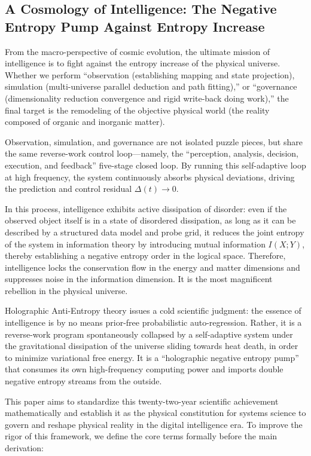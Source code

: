 \documentclass{article}
\begin{document}
\subsection*{A Cosmology of Intelligence: The Negative Entropy Pump Against Entropy Increase}
From the macro-perspective of cosmic evolution, the ultimate mission of intelligence is to fight against the entropy increase of the physical universe. Whether we perform ``observation (establishing mapping and state projection), simulation (multi-universe parallel deduction and path fitting),'' or ``governance (dimensionality reduction convergence and rigid write-back doing work),'' the final target is the remodeling of the objective physical world (the reality composed of organic and inorganic matter).

Observation, simulation, and governance are not isolated puzzle pieces, but share the same reverse-work control loop---namely, the ``perception, analysis, decision, execution, and feedback'' five-stage closed loop. By running this self-adaptive loop at high frequency, the system continuously absorbs physical deviations, driving the prediction and control residual $\Delta(t) \to 0$.

In this process, intelligence exhibits active dissipation of disorder: even if the observed object itself is in a state of disordered dissipation, as long as it can be described by a structured data model and probe grid, it reduces the joint entropy of the system in information theory by introducing mutual information $I(X; Y)$, thereby establishing a negative entropy order in the logical space. Therefore, intelligence locks the conservation flow in the energy and matter dimensions and suppresses noise in the information dimension. It is the most magnificent rebellion in the physical universe.

Holographic Anti-Entropy theory issues a cold scientific judgment: the essence of intelligence is by no means prior-free probabilistic auto-regression. Rather, it is a reverse-work program spontaneously collapsed by a self-adaptive system under the gravitational dissipation of the universe sliding towards heat death, in order to minimize variational free energy. It is a ``holographic negative entropy pump'' that consumes its own high-frequency computing power and imports double negative entropy streams from the outside.

This paper aims to standardize this twenty-two-year scientific achievement mathematically and establish it as the physical constitution for systems science to govern and reshape physical reality in the digital intelligence era. To improve the rigor of this framework, we define the core terms formally before the main derivation:
\end{document}

